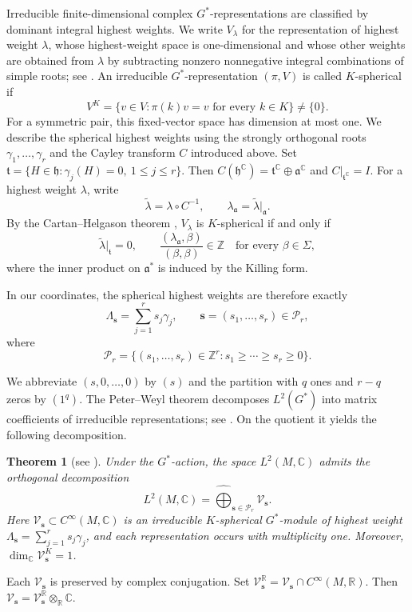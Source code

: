 \documentclass[11pt,reqno]{amsart}
\newtheorem{theorem}{Theorem}[section]
\theoremstyle{corollary}
\theoremstyle{conjecture}
\theoremstyle{assumption}
\theoremstyle{proposition}
\theoremstyle{remark}
\numberwithin{equation}{section}
\begin{document}
Irreducible finite-dimensional complex $G^*$-representations are classified by dominant integral highest weights. We write $V_\lambda$ for the representation of highest weight $\lambda$, whose highest-weight space is one-dimensional and whose other weights are obtained from $\lambda$ by subtracting nonzero nonnegative integral combinations of simple roots; see \cite[Theorems~5.5 and~5.110]{Knapp2002}. An irreducible $G^*$-representation $(\pi,V)$ is called $K$-spherical if
\[
V^K=\{v\in V\colon\pi(k)v=v\text{ for every }k\in K\}\neq\{0\}.
\]
For a symmetric pair, this fixed-vector space has dimension at most one. We describe the spherical highest weights using the strongly orthogonal roots $\gamma_1,\ldots,\gamma_r$ and the Cayley transform $C$ introduced above. Set $\mathfrak t=\{H\in\mathfrak h\colon\gamma_j(H)=0,\ 1\leq j\leq r\}$. Then $C(\mathfrak h^{\mathbb C})=\mathfrak t^{\mathbb C}\oplus\mathfrak a^{\mathbb C}$ and $C|_{\mathfrak t^{\mathbb C}}=I$. For a highest weight $\lambda$, write
\[
\widetilde\lambda=\lambda\circ C^{-1},\qquad\lambda_{\mathfrak a}=\widetilde\lambda|_{\mathfrak a}.
\]
By the Cartan--Helgason theorem \cite[Theorem~8.49]{Knapp2002}, $V_\lambda$ is $K$-spherical if and only if
\[
\widetilde\lambda|_{\mathfrak t}=0,\qquad\frac{(\lambda_{\mathfrak a},\beta)}{(\beta,\beta)}\in\mathbb Z\quad\text{for every }\beta\in\Sigma,
\]
where the inner product on $\mathfrak a^*$ is induced by the Killing form.

In our coordinates, the spherical highest weights are therefore exactly
\[
\Lambda_{\mathbf s}=\sum_{j=1}^r s_j\gamma_j,\qquad \mathbf s=(s_1,\ldots,s_r)\in\mathcal P_r,
\]
where
\[
\mathcal P_r=\{(s_1,\ldots,s_r)\in\mathbb Z^r\colon s_1\geq\cdots\geq s_r\geq 0\}.
\]

We abbreviate $(s,0,\ldots,0)$ by $(s)$ and the partition with $q$ ones and $r-q$ zeros by $(1^q)$. The Peter--Weyl theorem decomposes $L^2(G^*)$ into matrix coefficients of irreducible representations; see \cite[Theorem~4.20]{Knapp2002}. On the quotient it yields the following decomposition.


\begin{theorem}[see {\cite[Proposition~3.1]{Zhang1998}}]
\label{thm:spherical-decomposition}
Under the $G^*$-action, the space $L^2(M,\mathbb C)$ admits the orthogonal decomposition
\begin{equation}\label{eq:peter-weyl-chss}
L^2(M,\mathbb C)=\widehat{\bigoplus}_{\mathbf s\in\mathcal P_r}\mathcal V_{\mathbf s}.
\end{equation}
Here $\mathcal V_{\mathbf s}\subset C^\infty(M,\mathbb C)$ is an irreducible $K$-spherical $G^*$-module of highest weight $\Lambda_{\mathbf s}=\sum_{j=1}^r s_j\gamma_j$, and each representation occurs with multiplicity one. Moreover, $\operatorname{dim}_{\mathbb C}\mathcal V_{\mathbf s}^{K}=1$.
\end{theorem}
Each $\mathcal V_{\mathbf s}$ is preserved by complex conjugation. Set $\mathcal V_{\mathbf s}^{\mathbb R}=\mathcal V_{\mathbf s}\cap C^\infty(M,\mathbb R)$. Then $\mathcal V_{\mathbf s}=\mathcal V_{\mathbf s}^{\mathbb R}\otimes_{\mathbb R}\mathbb C$.
\end{document}
